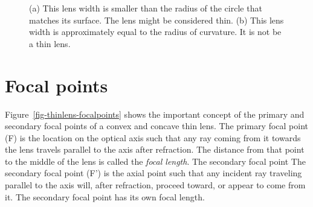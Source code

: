 \documentclass[
  letterpaper,
]{book}
\begin{document}
\begin{figure}


\caption{\label{fig-thinlens-definition}(a) This lens width is smaller
than the radius of the circle that matches its surface. The lens might
be considered thin. (b) This lens width is approximately equal to the
radius of curvature. It is not be a thin lens.}

\end{figure}%

\section{Focal points}\label{sec-optics-focalpoints}

Figure~\ref{fig-thinlens-focalpoints} shows the important concept of the
primary and secondary focal points of a convex and concave thin lens.
The primary focal point (F) is the location on the optical axis such
that any ray coming from it towards the lens travels parallel to the
axis after refraction. The distance from that point to the middle of the
lens is called the \emph{focal length}. The secondary focal point The
secondary focal point (F') is the axial point such that any incident ray
traveling parallel to the axis will, after refraction, proceed toward,
or appear to come from it. The secondary focal point has its own focal
length.
\end{document}
